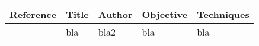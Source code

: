 


\begin{center}
    \begin{tabular}{l | l | l | l | l} 
    \hline
    Reference & Title & Author & Objective & Techniques  \\ [0.5ex] 
    \hline
    \cite{DasCLuciaMS2017} & bla & bla2 & bla & bla \\
    \hline
   \end{tabular}
\end{center}